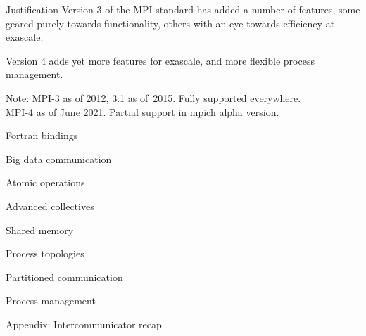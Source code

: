 \documentclass[11pt,headernav]{beamer}
\begin{document}
\begin{frame}{Justification}
  Version 3 of the MPI standard has added a number
  of features, some geared purely towards functionality,
  others with an eye towards efficiency at exascale.

  Version 4 adds yet more features for exascale,
  and more flexible process management.

  Note: MPI-3 as of 2012, 3.1 as of~2015. Fully supported everywhere.\\
  MPI-4 as of June 2021. Partial support in mpich alpha version.
\end{frame}

 {Fortran bindings}


 {Big data communication}


 {Atomic operations}

%
 
 {Advanced collectives}


 {Shared memory}


 {Process topologies}


 {Partitioned communication}


 {Process management}


 {Appendix: Intercommunicator recap}




\end{document}

